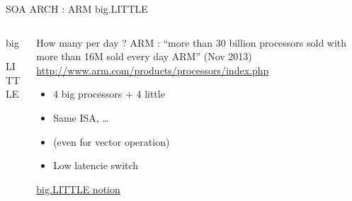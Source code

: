 \begin{Frame}{SOA ARCH : ARM big.LITTLE}
  \begin{columns}[t]
    \begin{column}[t]{\BW}
      \begin{block}{big}
      \end{block}
      \begin{block}{LITTLE}
      \end{block}
    \end{column}
    \begin{column}[t]{\BW}
      \begin{block}{How many per day ?}
      ARM : ``more than 30 billion processors sold with
        more than 16M sold every day ARM'' (Nov 2013)
        \url{http://www.arm.com/products/processors/index.php}

      \begin{itemize}
      \item 4 big processors + 4 little
      \item Same ISA, \ldots
      \item (even for vector operation)
      \item Low latencie switch
      \end{itemize}
      
\href{http://www.arm.com/products/processors/technologies/biglittleprocessing.php}{big.LITTLE notion}
        
      \end{block}
    \end{column}
  \end{columns}
\end{Frame}


